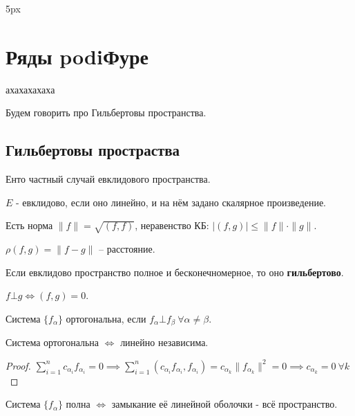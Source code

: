 
\parindent 5px

\usepackage{amsfonts, amssymb, amsmath, mathtools, amsthm}  %
\usepackage{mathrsfs}


\renewcommand{\baselinestretch}{1.3} 
\DeclareMathOperator{\tp}{Tp}
\DeclareMathOperator{\tm}{TM}
\setcounter{lemma}{0}


  \section*{Ряды podiФуре}
  ахахахахаха

  Будем говорить про Гильбертовы пространства.

  \subsection*{Гильбертовы простраства}

  Енто частный случай евклидового пространства.

  $E$ - евклидово, если оно линейно, и на нём задано скалярное произведение.
  
  Есть норма $\|f\| = \sqrt{(f,f)}$, неравенство КБ: $|(f,g)| \le \|f\| \cdot \|g\|$.

  $\rho(f,g) = \| f-g\|$ -- расстояние.

  \begin{definition}
    
  Если евклидово пространство полное и бесконечномерное, то оно \textbf{гильбертово}.
  \end{definition}
  $f \bot g \iff (f,g) = 0$.

  \begin{definition} 
    Система $\{f_\alpha\}$ ортогональна, если $f_\alpha \bot f_\beta \ \forall \alpha \neq \beta$.
  \end{definition}
  \begin{proposition}
    Система ортогональна $\iff$ линейно независима.
  \end{proposition}
  \begin{proof}
    $\sum^n_{i=1}c_{\alpha_i}f_{\alpha_i} = 0 \implies \sum^n_{i=1} (c_{\alpha_i}f_{\alpha_i}, f_{\alpha_i}) = c_{\alpha_k}\|f_{\alpha_k}\|^2 = 0 \implies c_{\alpha_k} = 0 \ \forall k$
  \end{proof}

  \begin{definition}
    Система $\{f_\alpha\}$ полна $\iff$ замыкание её линейной оболочки - всё пространство.  
  \end{definition}

